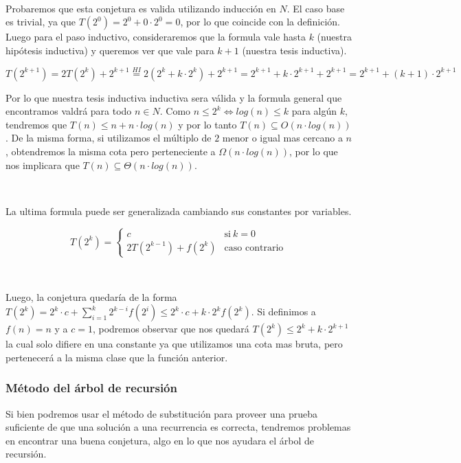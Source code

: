 ~

Probaremos que esta conjetura es valida utilizando inducci\'on en $N$. El caso base es trivial, ya que $T(2^0) = 2^0 + 0 \cdot 2^0 = 0$, por lo que coincide con la definici\'on. Luego para el paso inductivo, consideraremos que la formula vale hasta $k$ (nuestra hip\'otesis inductiva) y queremos ver que vale para $k+1$ (nuestra tesis inductiva).

\begin{equation*}
 T(2^{k+1}) = 2T(2^k) + 2^{k+1} \overset{HI}{=} 2(2^k + k \cdot 2^k) + 2^{k+1} = 2^{k+1} + k \cdot 2^{k+1} + 2^{k+1} = 2^{k+1} + (k+1) \cdot 2^{k+1}
\end{equation*}

Por lo que nuestra tesis inductiva inductiva sera v\'alida y la formula general que encontramos valdr\'a para todo $n \in N$. Como $n \leq 2^k \iff log(n) \leq k$ para alg\'un $k$, tendremos que $T(n) \leq n + n \cdot log(n)$ y por lo tanto $T(n) \subseteq O(n \cdot log(n))$. De la misma forma, si utilizamos el m\'ultiplo de $2$ menor o igual mas cercano a $n$, obtendremos la misma cota pero perteneciente a $\Omega(n \cdot log(n))$, por lo que nos implicara que $T(n) \subseteq \Theta(n \cdot log(n))$.

~

La ultima formula puede ser generalizada cambiando sus constantes por variables.

\begin{equation*}
  T(2^k) = \begin{cases}
	      c         		& \text{si} \ k = 0 \\
	      2T(2^{k-1}) + f(2^k)        	& \text{caso contrario}
	  \end{cases}
\end{equation*}

~

Luego, la conjetura quedar\'ia de la forma $T(2^k) = 2^k \cdot c + \sum_{i=1}^k 2^{k-i} f(2^i) \leq 2^k \cdot c + k \cdot 2^k f(2^k)$. Si definimos a $f(n) = n$ y a $c=1$, podremos observar que nos quedar\'a $T(2^k) \leq 2^k + k \cdot 2^{k+1}$ la cual solo difiere en una constante ya que utilizamos una cota mas bruta, pero pertenecer\'a a la misma clase que la funci\'on anterior.

\subsubsection{M\'etodo del \'arbol de recursi\'on}

Si bien podremos usar el m\'etodo de substituci\'on para proveer una prueba suficiente de que una soluci\'on a una recurrencia es correcta, tendremos problemas en encontrar una buena conjetura, algo en lo que nos ayudara el \'arbol de recursi\'on.

